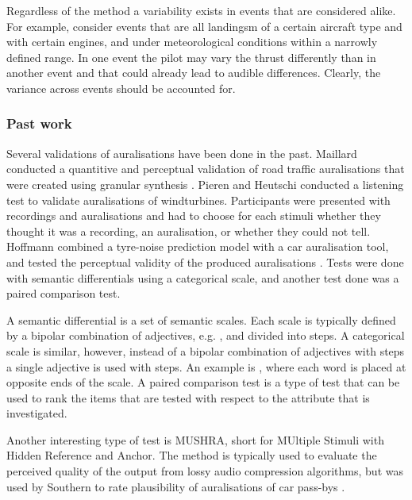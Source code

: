 Regardless of the method a variability exists in events that are considered
alike. For example, consider events that are all landingsm of a certain aircraft
type and with certain engines, and under meteorological conditions within a narrowly
defined range. In one event the pilot may vary the thrust differently than in
another event and that could already lead to audible differences.
Clearly, the variance across events should be accounted for.

\subsubsection*{Past work}
Several validations of auralisations have been done in the past. Maillard
conducted a quantitive and perceptual validation of road traffic auralisations
that were created using granular synthesis \cite{Maillard2014}. Pieren and
Heutschi conducted a listening test to validate auralisations of
windturbines. Participants were presented with recordings and auralisations and
had to choose for each stimuli whether they thought it was a recording, an
auralisation, or whether they could not tell. Hoffmann combined a tyre-noise
prediction model with a car auralisation tool, and tested the perceptual
validity of the produced auralisations \cite{Hoffmann2016a,Hoffmann2016}. Tests
were done with semantic differentials using a categorical scale, and another
test done was a paired comparison test.

A semantic differential is a set of semantic scales. Each scale is typically
defined by a bipolar combination of adjectives, e.g. , and
divided into steps. A categorical scale is similar, however, instead of a
bipolar combination of adjectives with steps a single adjective is used with
steps. An example is , where each word is placed at opposite
ends of the scale. A paired comparison test is a type of test that can be used
to rank the items that are tested with respect to the attribute that is
investigated.

Another interesting type of test is MUSHRA, short for MUltiple Stimuli with
Hidden Reference and Anchor. The method is typically used to evaluate the
perceived quality of the output from lossy audio compression algorithms, but was
used by Southern to rate plausibility of auralisations of car pass-bys
\cite{Southern2016}.

